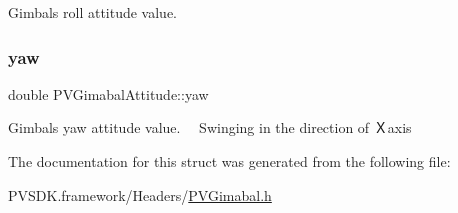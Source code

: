 Gimbal\textquotesingle{}s roll attitude value. \mbox{\label{struct_p_v_gimabal_attitude_a5429d6588fd4224d15603e2100482020}} 
\subsubsection{\texorpdfstring{yaw}{yaw}}
{\footnotesize\ttfamily double P\+V\+Gimabal\+Attitude\+::yaw}

Gimbal\textquotesingle{}s yaw attitude value. 　\+Swinging in the direction of Ｘaxis 

The documentation for this struct was generated from the following file\+:\begin{DoxyCompactItemize}
\item 
P\+V\+S\+D\+K.\+framework/\+Headers/\hyperlink{_p_v_gimabal_8h}{P\+V\+Gimabal.\+h}\end{DoxyCompactItemize}
